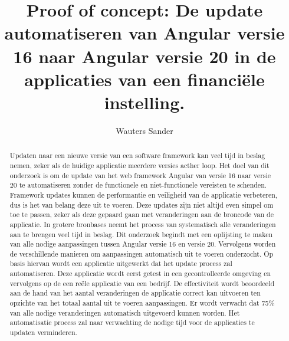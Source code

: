 \documentclass{hogent-article}
\title{Proof of concept: De update automatiseren van Angular versie 16 naar Angular versie 20 in de applicaties van een financiële instelling.}
\author{Wauters Sander}
\begin{document}
\begin{abstract}

Updaten naar een nieuwe versie van een software framework kan veel tijd in beslag nemen, zeker als de huidige applicatie meerdere versies acther loop.
Het doel van dit onderzoek is om de update van het web framework Angular van versie 16 naar versie 20 te automatiseren zonder de functionele en niet-functionele vereisten te schenden.
Framework updates kunnen de performantie en veiligheid van de applicatie verbeteren, dus is het van belang deze uit te voeren.
Deze updates zijn niet altijd even simpel om toe te passen, zeker als deze gepaard gaan met veranderingen aan de broncode van de applicatie.
In grotere bronbases neemt het process van systematisch alle veranderingen aan te brengen veel tijd in beslag.
Dit onderzoek begindt met een oplijsting te maken van alle nodige aanpassingen tussen Angular versie 16 en versie 20.
Vervolgens worden de verschillende manieren om aanpassingen automatisch uit te voeren onderzocht.
Op basis hiervan wordt een applicatie uitgewerkt dat het update process zal automatiseren.
Deze applicatie wordt eerst getest in een gecontrolleerde omgeving en vervolgens op de een reële applicatie van een bedrijf.
De effectiviteit wordt beoordeeld aan de hand van het aantal veranderingen de applicatie correct kan uitvoeren ten opzichte van het totaal aantal uit te voeren aanpassingen.
Er wordt verwacht dat 75\% van alle nodige veranderingen automatisch uitgevoerd kunnen worden.
Het automatisatie process zal naar verwachting de nodige tijd voor de applicaties te updaten verminderen.

\end{abstract}

\tableofcontents



\printbibliography[heading=bibintoc]
\end{document}
